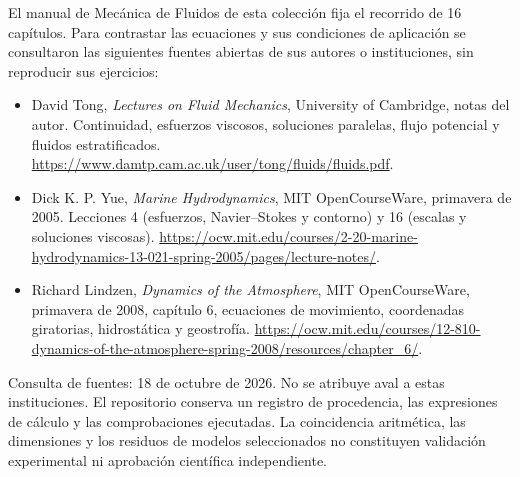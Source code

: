 \documentclass[10pt,a4paper,openany]{book}
\begin{document}
El manual de Mecánica de Fluidos de esta colección fija el recorrido de 16 capítulos. Para contrastar las ecuaciones y sus condiciones de aplicación se consultaron las siguientes fuentes abiertas de sus autores o instituciones, sin reproducir sus ejercicios:
\begin{itemize}
\item David Tong, \emph{Lectures on Fluid Mechanics}, University of Cambridge, notas del autor. Continuidad, esfuerzos viscosos, soluciones paralelas, flujo potencial y fluidos estratificados. \url{https://www.damtp.cam.ac.uk/user/tong/fluids/fluids.pdf}.
\item Dick K. P. Yue, \emph{Marine Hydrodynamics}, MIT OpenCourseWare, primavera de 2005. Lecciones 4 (esfuerzos, Navier--Stokes y contorno) y 16 (escalas y soluciones viscosas). \url{https://ocw.mit.edu/courses/2-20-marine-hydrodynamics-13-021-spring-2005/pages/lecture-notes/}.
\item Richard Lindzen, \emph{Dynamics of the Atmosphere}, MIT OpenCourseWare, primavera de 2008, capítulo 6, ecuaciones de movimiento, coordenadas giratorias, hidrostática y geostrofía. \url{https://ocw.mit.edu/courses/12-810-dynamics-of-the-atmosphere-spring-2008/resources/chapter_6/}.
\end{itemize}
Consulta de fuentes: 18 de octubre de 2026. No se atribuye aval a estas instituciones. El repositorio conserva un registro de procedencia, las expresiones de cálculo y las comprobaciones ejecutadas. La coincidencia aritmética, las dimensiones y los residuos de modelos seleccionados no constituyen validación experimental ni aprobación científica independiente.
\end{document}
